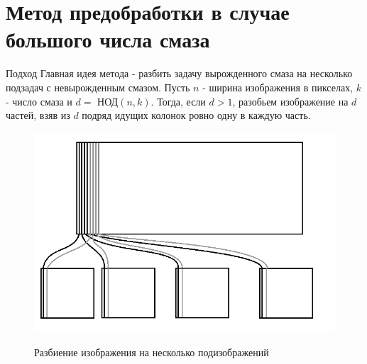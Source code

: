 \documentclass[10pt]{beamer}
\begin{document}
\section[Метод разбиения]{Метод предобработки в случае большого числа смаза}
\begin{frame}
\begin{block}{Подход}
Главная идея метода - разбить задачу вырожденного смаза на несколько подзадач с невырожденным смазом.
Пусть $n$ - ширина изображения в пикселах, $k$ - число смаза и $d =$ НОД$(n, k)$. Тогда, если $d > 1$, разобьем изображение на $d$ частей, взяв из $d$ подряд идущих колонок ровно одну в каждую часть.
\end{block}

\begin{block}{}
 \begin{figure}[H]
            \includegraphics[scale=0.2]{fig1.png}
            \label{Pic1}
            \caption[Разбиение изображения на несколько подизображений]{Разбиение изображения на несколько подизображений}
        \end{figure}
\end{block}

\end{frame}
\end{document}
